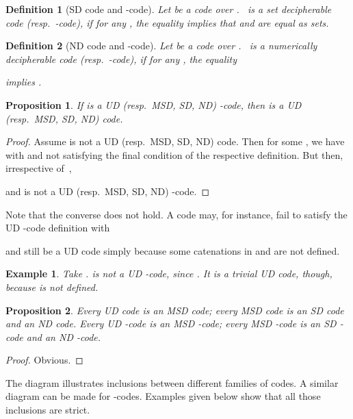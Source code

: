 \documentclass[final,nomarks]{dmtcs-episciences}
\newtheorem{definition}{Definition}
\newtheorem{example}{Example}
\newtheorem{proposition}{Proposition}
\begin{document}
\begin{definition}[SD code and -code]
Let  be a code over . ~is a \emph{set decipherable
code} (resp.\ \emph{-code}), if for any ,
 the equality  implies that
 and  are equal as sets.
\end{definition}


\begin{definition}[ND code and -code]
Let  be a code over . ~is a \emph{numerically
decipherable code} (resp.\ \emph{-code}), if for any
,  the equality

implies .
\end{definition}



\begin{proposition}\label{prop:incl1}
If  is a UD (resp.\ MSD, SD, ND) -code, 
then  is a UD (resp.\ MSD, SD, ND) code.
\end{proposition}

\begin{proof}
Assume  is not a UD (resp.\ MSD, SD, ND) code. Then for some
,  we have
 with
 and  not satisfying the
final condition of the respective definition. But then,
irrespective of~,

and  is not a UD (resp.\ MSD, SD, ND) -code.
\end{proof}

Note that the converse does not hold. A code may, for instance, fail to satisfy the 
UD -code definition with 
 
and still be a UD code simply because some catenations in 
 and  are not defined.


\begin{example}
Take .  is not a UD -code, since . It is a trivial UD code, though, because  is not defined.
\end{example}


\begin{proposition}\label{prop:incl2}
Every UD code is an MSD code; every MSD code is an SD code and
an ND code. Every UD -code is an MSD -code; every MSD
-code is an SD -code and an ND -code.
\end{proposition}

\begin{proof}
Obvious. 
\end{proof}


The diagram illustrates inclusions between different families of codes. 
A similar diagram can be made for -codes.
Examples given below show that all those inclusions are strict.
\end{document}
